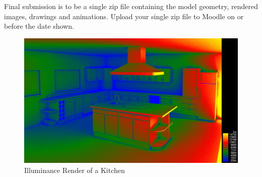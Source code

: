 Final submission is to be a single zip file containing the model geometry, rendered images, drawings and animations.  Upload your single zip file to Moodle on or before the date shown.

\begin{figure}[hb]
	\centering
		\includegraphics[width=1.00\textwidth]{img/KitchenIll.jpg}
	\caption{Illuminance Render of a Kitchen}
	\label{fig:KitchenIll}
\end{figure}


